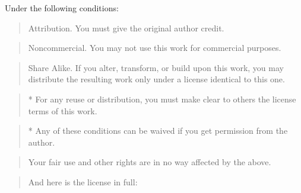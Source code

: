 Under the following conditions:

\begin{quote}
Attribution. You must give the original author credit.
\end{quote}
\begin{quote}
Noncommercial. You may not use this work for commercial purposes.
\end{quote}
\begin{quote}
Share Alike. If you alter, transform, or build upon this work, you
may distribute the resulting work only under a license identical to
this one.
\end{quote}
\begin{quote}
* For any reuse or distribution, you must make clear to others the
license terms of this work.
\end{quote}
\begin{quote}
* Any of these conditions can be waived if you get permission from
the author.
\end{quote}
\begin{quote}
Your fair use and other rights are in no way affected by the above.
\end{quote}
\begin{quote}
And here is the license in full:
\end{quote}
